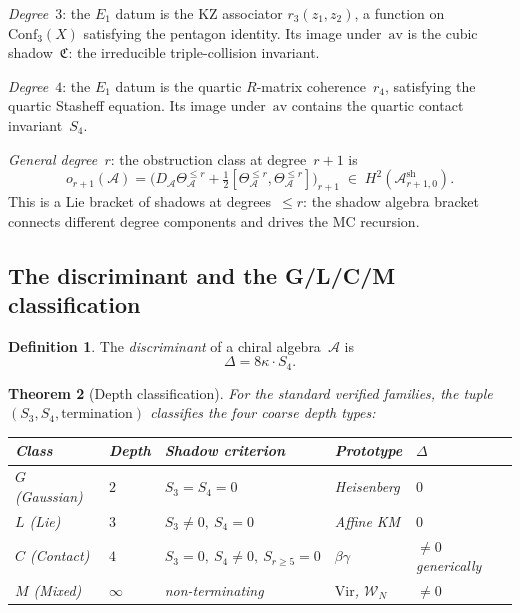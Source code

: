 \documentclass[11pt,reqno]{amsart}
\newtheorem{theorem}{Theorem}[section]
\theoremstyle{definition}
\newtheorem{definition}[theorem]{Definition}
\theoremstyle{remark}
\newcommand{\cA}{\mathcal{A}}
\newcommand{\cW}{\mathcal{W}}
\newcommand{\Eone}{E_1}
\newcommand{\Ash}{\cA^{\mathrm{sh}}}
\newcommand{\Conf}{\mathrm{Conf}}
\newcommand{\Vir}{\mathrm{Vir}}
\newcommand{\av}{\mathrm{av}}
\numberwithin{equation}{section}
\begin{document}
\medskip\noindent
\emph{Degree~$3$}: the $\Eone$ datum is the KZ associator
$r_3(z_1,z_2)$, a function on $\Conf_3(X)$ satisfying the
pentagon identity. Its image under~$\av$ is the cubic
shadow~$\mathfrak{C}$: the irreducible triple-collision
invariant.

\medskip\noindent
\emph{Degree~$4$}: the $\Eone$ datum is the quartic
$R$-matrix coherence~$r_4$, satisfying the quartic Stasheff
equation. Its image under~$\av$ contains the quartic contact
invariant~$S_4$.

\medskip\noindent
\emph{General degree~$r$}: the obstruction class at degree~$r+1$
is
\begin{equation}\label{eq:obstruction-class}
o_{r+1}(\cA)
= \bigl(D_\cA\Theta^{\le r}_\cA
+ \tfrac{1}{2}[\Theta^{\le r}_\cA,
 \Theta^{\le r}_\cA]\bigr)_{r+1}
\;\in\; H^2(\Ash_{r+1,0}).
\end{equation}
This is a Lie bracket of shadows at degrees~$\le r$: the
shadow algebra bracket connects different degree components and
drives the MC recursion.

\subsection{The discriminant and the G/L/C/M classification}

\begin{definition}\label{def:discriminant}
The \emph{discriminant} of a chiral algebra~$\cA$ is
\begin{equation}\label{eq:discriminant}
\Delta = 8\kappa\cdot S_4.
\end{equation}
\end{definition}

\begin{theorem}[Depth classification]\label{thm:depth-class}
For the standard verified families, the tuple
$(S_3,S_4,\text{termination})$ classifies the four coarse depth
types:
\begin{center}
\begin{tabular}{@{}lllll@{}}
\toprule
Class & Depth & Shadow criterion & Prototype & $\Delta$ \\
\midrule
$G$ \textup{(Gaussian)} & $2$ & $S_3=S_4=0$ &
 Heisenberg & $0$ \\
$L$ \textup{(Lie)} & $3$ & $S_3\ne0,\ S_4=0$ &
 Affine KM & $0$ \\
$C$ \textup{(Contact)} & $4$ &
 $S_3=0,\ S_4\ne0,\ S_{r\ge5}=0$ &
 $\beta\gamma$ & $\ne0$ generically \\
$M$ \textup{(Mixed)} & $\infty$ & non-terminating &
 $\Vir$, $\cW_N$ & $\neq 0$ \\
\bottomrule
\end{tabular}
\end{center}
\end{theorem}
\end{document}
